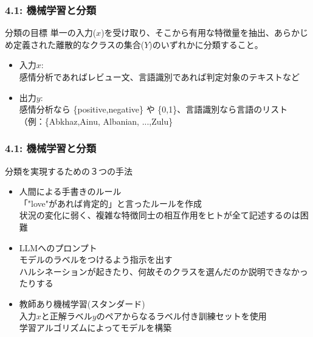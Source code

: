 \documentclass[unicode,11pt]{beamer} %
\begin{document}
\begin{frame}
    \frametitle{4.1: 機械学習と分類}
    \begin{alertblock}{分類の目標}
        単一の入力($x$)を受け取り、そこから有用な特徴量を抽出、あらかじめ定義された離散的なクラスの集合($Y$)のいずれかに分類すること。
        \begin{itemize}
            \item 入力$x$: \\感情分析であればレビュー文、言語識別であれば判定対象のテキストなど
            \item 出力$y$: \\感情分析なら \{positive,negative\} や \{0,1\}、言語識別なら言語のリスト（例：\{Abkhaz,Ainu, Albanian, ...,Zulu\}
        \end{itemize}
    \end{alertblock}
\end{frame}


\begin{frame}
    \frametitle{4.1: 機械学習と分類}
    \begin{alertblock}{分類を実現するための３つの手法}
        \begin{itemize}
            \item 人間による手書きのルール \\ 「"love"があれば肯定的」と言ったルールを作成 \\ 状況の変化に弱く、複雑な特徴同士の相互作用をヒトが全て記述するのは困難
            \item LLMへのプロンプト \\ モデルのラベルをつけるよう指示を出す \\ ハルシネーションが起きたり、何故そのクラスを選んだのか説明できなかったりする
            \item 教師あり機械学習(スタンダード) \\ 入力$x$と正解ラベル$y$のペアからなるラベル付き訓練セットを使用 \\ 学習アルゴリズムによってモデルを構築
        \end{itemize}
    \end{alertblock}
\end{frame}
\end{document}
